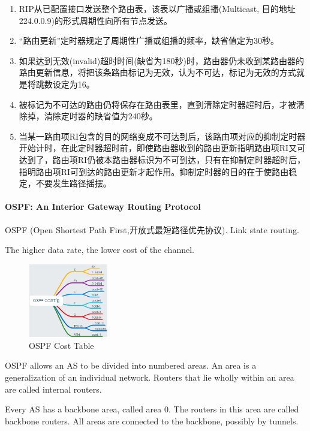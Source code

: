 \begin{enumerate}\small
    \item RIP从已配置接口发送整个路由表，该表以广播或组播(Multicast, 目的地址224.0.0.9)的形式周期性向所有节点发送。
    \item “路由更新”定时器规定了周期性广播或组播的频率，缺省值定为30秒。
    \item 如果达到无效(invalid)超时时间(缺省为180秒)时，路由器仍未收到某路由器的路由更新信息，将把该条路由标记为无效，认为不可达，标记为无效的方式就是将跳数设定为16。
    \item 被标记为不可达的路由仍将保存在路由表里，直到清除定时器超时后，才被清除掉，清除定时器的缺省值为240秒。
    \item 当某一路由项RI包含的目的网络变成不可达到后，该路由项对应的抑制定时器开始计时，在此定时器超时前，即使路由器收到的路由更新指明路由项RI又可达到了，路由项RI仍被本路由器标识为不可到达，只有在抑制定时器超时后，指明路由项RI可到达的路由更新才起作用。抑制定时器的目的在于使路由稳定，不要发生路径摇摆。
\end{enumerate}

\paragraph{OSPF: An Interior Gateway Routing Protocol}%
OSPF (Open Shortest Path First,开放式最短路径优先协议). Link state routing. 

The higher data rate, the lower cost of the channel.

\begin{figure}[!htb]
    \centering
    \includegraphics[width=0.309\textwidth]{pic/CN5/OSPF Cost Table}
    \caption{OSPF Cost Table}
\end{figure}


OSPF allows an AS to be divided into numbered areas. An area is a generalization of an individual network. Routers that lie wholly within an area are called internal routers.

Every AS has a backbone area, called area 0. The routers in this area are called backbone routers. All areas are connected to the backbone, possibly by tunnels. 

